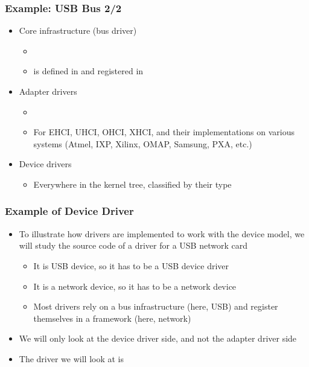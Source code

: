 \begin{frame}
  \frametitle{Example: USB Bus 2/2}
  \begin{itemize}
  \item Core infrastructure (bus driver)
    \begin{itemize}
    \item {}
    \item {} is defined in
       and registered in
    \end{itemize}
  \item Adapter drivers
    \begin{itemize}
    \item {}
    \item For EHCI, UHCI, OHCI, XHCI, and their implementations on
      various systems (Atmel, IXP, Xilinx, OMAP, Samsung, PXA, etc.)
    \end{itemize}
  \item Device drivers
    \begin{itemize}
    \item Everywhere in the kernel tree, classified by their type
    \end{itemize}
  \end{itemize}
\end{frame}

\begin{frame}
  \frametitle{Example of Device Driver}
  \begin{itemize}
  \item To illustrate how drivers are implemented to work with the
    device model, we will study the source code of a driver for a USB
    network card
    \begin{itemize}
    \item It is USB device, so it has to be a USB device driver
    \item It is a network device, so it has to be a network device
    \item Most drivers rely on a bus infrastructure (here, USB) and
      register themselves in a framework (here, network)
    \end{itemize}
  \item We will only look at the device driver side, and not the
    adapter driver side
  \item The driver we will look at is 
  \end{itemize}
\end{frame}

